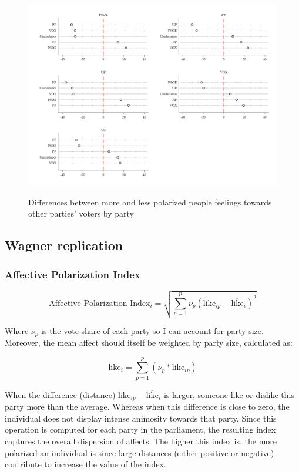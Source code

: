 \documentclass[a4paper, svgnames]{article}
\begin{document}
\begin{figure}[H]
	\centering
	\caption{Differences between more and less polarized people feelings towards other parties' voters by party}
	\includegraphics[width=\textwidth]{Figures/combined_dot_feelingsAP.png}
	\label{fig:dot-distances}
\end{figure}


\subsection{Wagner replication}

\subsubsection{Affective Polarization Index}

$$
	\text{Affective Polarization Index}_i = \sqrt{\sum^p_{p=1}\nu_p(\text{like}_{ip}-\overline{\text{like}}_i)^2}
$$

Where $\nu_p$ is the vote share of each party so I can account for party size. Moreover, the mean affect should itself be weighted by party size, calculated as:

$$
	\overline{\text{like}}_i = \sum^p_{p=1} (\nu_p * \text{like}_{ip})
$$

When the difference (distance) $\text{like}_{ip}-\overline{\text{like}}_i$ is larger, someone like or dislike this party more than the average. Whereas when this difference is close to zero, the individual does not display intense animosity towards that party. Since this operation is computed for each party in the parliament, the resulting index captures the overall dispersion of affects. The higher this index is, the more polarized an individual is since large distances (either positive or negative) contribute to increase the value of the index.
\end{document}
